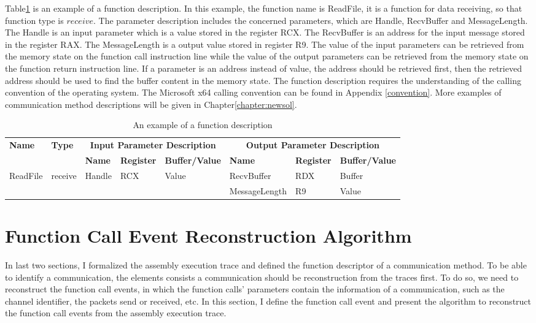 Table\ref{functionexample} is an example of a function description. In this example, the function name is ReadFile, it is a function for data receiving, so that function type is $receive$. The parameter description includes the concerned parameters, which are Handle, RecvBuffer and MessageLength. The Handle is an input parameter which is a value stored in the register RCX. The RecvBuffer is an address for the input message stored in the register RAX. The MessageLength is a output value stored in register R9. The value of the input parameters can be retrieved from the memory state on the function call instruction line while the value of the output parameters can be retrieved from the memory state on the function return instruction line. If a parameter is an address instead of value, the address should be retrieved first, then the retrieved address should be used to find the buffer content in the memory state. The function description requires the understanding of the calling convention of the operating system. The Microsoft x64 calling convention can be found in Appendix \ref{convention}. More examples of communication method descriptions will be given in Chapter\ref{chapter:newsol}.

\begin{table}[H]
        \centering
        \caption{An example of a function description}
        \label{functionexample}
        \begin{tabular}{|l|l|l|l|l|l|l|l|}
            \hline
             \multirow{2}{*}{{\textbf{Name}}} & \multirow{2}{*}{{\textbf{Type}}} & \multicolumn{3}{c|}{\textbf{Input Parameter Description}} & \multicolumn{3}{c|}{\textbf{Output Parameter Description}} \\
              \cline{3-8} 
             & & \textbf{Name}& \textbf{Register} &  \textbf{Buffer/Value} & \textbf{Name}& \textbf{Register} &  \textbf{Buffer/Value}  \\
             \hline
             \multirow{2}{*}{ReadFile}
             &\multirow{2}{*}{receive} &  \multirow{2}{*}{Handle} & \multirow{2}{*}{RCX} & \multirow{2}{*}{Value} & RecvBuffer & RDX  & Buffer\\
              \cline{6-8} 
             & & & & & MessageLength & R9  & Value\\
            \hline            
        \end{tabular}
    \end{table}

\section{Function Call Event Reconstruction Algorithm}
In last two sections, I formalized the assembly execution trace and defined the function descriptor of a communication method. To be able to identify a communication, the elements consists a communication should be reconstruction from the traces first. To do so, we need to reconstruct the function call events, in which the function calls' parameters contain the information of a communication, such as the channel identifier, the packets send or received, etc. In this section, I define the function call event and present the algorithm to reconstruct the function call events from the assembly execution trace. 

